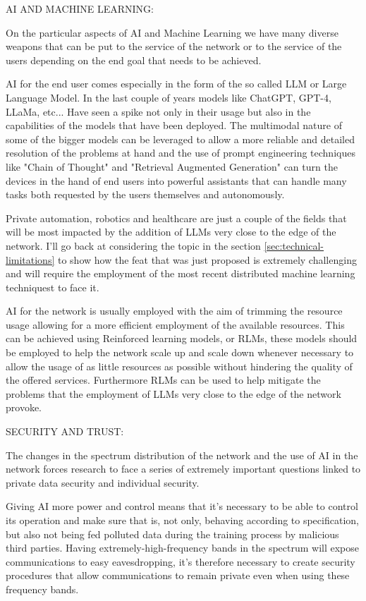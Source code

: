 \bigskip
\noindent
AI AND MACHINE LEARNING:
\label{ssec:ai-ml}

On the particular aspects of AI and Machine Learning we have many diverse weapons that can be put to
the service of the network or to the service of the users depending on the end goal that needs to
be achieved.

AI for the end user comes especially in the form of the so called LLM or Large Language Model. In
the last couple of years models like ChatGPT, GPT-4, LLaMa, etc... Have seen a spike not only in
their usage but also in the capabilities of the models that have been deployed. The multimodal
nature of some of the bigger models can be leveraged to allow a more reliable and detailed
resolution of the problems at hand and the use of prompt engineering techniques like "Chain of
Thought" and "Retrieval Augmented Generation" can turn the devices in the hand of end users into powerful assistants that can handle many tasks both requested by the users themselves and autonomously.

Private automation, robotics and healthcare are just a couple of the fields that will be most
impacted by the addition of LLMs very close to the edge of the network. I'll go back at considering
the topic in the section \ref{sec:technical-limitations} to show how the feat that was just proposed
is extremely challenging and will require the employment of the most recent distributed machine
learning techniquest to face it.

AI for the network is usually employed with the aim of trimming the resource usage allowing for a
more efficient employment of the available resources. This can be achieved using Reinforced learning models, or RLMs, these models should be
employed to help the network scale up and scale down whenever necessary to allow the usage of as
little resources as possible without hindering the quality of the offered services. Furthermore RLMs can be
used to help mitigate the problems that the employment of LLMs very close to the edge of the network
provoke.

\bigskip
\noindent
SECURITY AND TRUST:
\label{ssec:security-trust}

The changes in the spectrum distribution of the network and the use of AI in the network forces
research to face a series of extremely important questions linked to private data security and
individual security.

Giving AI more power and control means that it's necessary to be able to
control its operation and make sure that is, not only, behaving according to specification, but also
not being fed polluted data during the training process by malicious third parties. Having extremely-high-frequency bands in the spectrum will expose communications to easy
eavesdropping, it's therefore necessary to create security procedures that allow communications to
remain private even when using these frequency bands.

